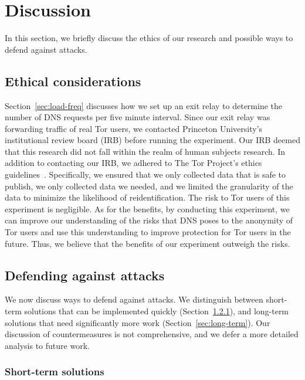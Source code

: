 \section{Discussion}
\label{sec:discussion}

In this section, we briefly discuss the ethics of our research and
possible ways to defend against \name attacks.

\subsection{Ethical considerations}
\label{sec:ethics}

Section~\ref{sec:load-freq} discusses how we set up an exit relay to
determine the number of DNS requests per five minute interval.  Since
our exit relay was forwarding traffic of real Tor users, we contacted Princeton
University's institutional review board (IRB) before running the
experiment.  Our IRB deemed that this research did not fall within the
realm of human subjects research.  In addition to contacting our IRB, we
adhered to The Tor Project's ethics guidelines~\cite{ethics-guidelines}.
Specifically, \first we ensured that we only collected data that is safe
to publish, \second we only collected data we needed, and \third we
limited the granularity of the data to minimize the likelihood of
reidentification.  The risk to Tor users of this experiment is negligible.
As for the benefits, by conducting this experiment, we can improve our
understanding of the risks that DNS poses to the anonymity of Tor users
and use this understanding to improve protection for Tor users in the
future.
Thus, we believe that the benefits of our experiment outweigh the risks.

\subsection{Defending against \name attacks}

We now discuss ways to defend against \name attacks.  We distinguish
between short-term solutions that can be implemented quickly
(Section~\ref{sec:short-term}), and long-term solutions that need significantly
more work (Section~\ref{sec:long-term}).  Our discussion of countermeasures is
not comprehensive, and we defer a more detailed analysis to future work.

\subsubsection{Short-term solutions}
\label{sec:short-term}

